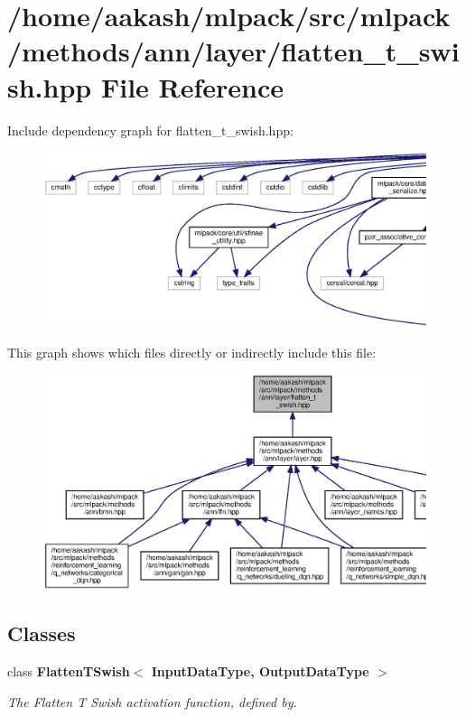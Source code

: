 \section{/home/aakash/mlpack/src/mlpack/methods/ann/layer/flatten\+\_\+t\+\_\+swish.hpp File Reference}
\label{flatten__t__swish_8hpp}
Include dependency graph for flatten\+\_\+t\+\_\+swish.\+hpp\+:
\nopagebreak
\begin{figure}[H]
\begin{center}
\leavevmode
\includegraphics[width=350pt]{flatten__t__swish_8hpp__incl}
\end{center}
\end{figure}
This graph shows which files directly or indirectly include this file\+:
\nopagebreak
\begin{figure}[H]
\begin{center}
\leavevmode
\includegraphics[width=350pt]{flatten__t__swish_8hpp__dep__incl}
\end{center}
\end{figure}
\subsection*{Classes}
\begin{DoxyCompactItemize}
\item 
class \textbf{ Flatten\+T\+Swish$<$ Input\+Data\+Type, Output\+Data\+Type $>$}
\begin{DoxyCompactList}\small\item\em The Flatten T Swish activation function, defined by. \end{DoxyCompactList}\end{DoxyCompactItemize}
